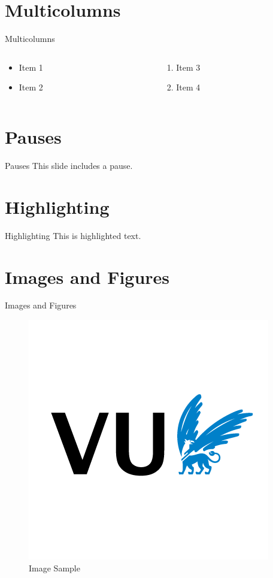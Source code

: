 \documentclass[aspectratio=43]{beamer}
\begin{document}
\section{Multicolumns}
\begin{frame}{Multicolumns}
  \begin{columns}[T] %
    \begin{column}{.5\textwidth}
      \begin{itemize}
        \item Item 1
        \item Item 2
      \end{itemize}
    \end{column}
    \begin{column}{.5\textwidth}
      \begin{enumerate}
        \item Item 3
        \item Item 4
      \end{enumerate}
    \end{column}
  \end{columns}
\end{frame}

\section{Pauses}
\begin{frame}{Pauses}
    This slide includes \pause a pause.
\end{frame}

\section{Highlighting}
\begin{frame}{Highlighting}
  This is \alert{highlighted} text.
\end{frame}

\section{Images and Figures}
\begin{frame}{Images and Figures}
  \begin{figure}
    \centering
    \includegraphics[width=.6\textwidth]{vu-beamer/assets/VU-avatar-RGB.png}
    \caption{Image Sample}
  \end{figure}
\end{frame}
\end{document}
